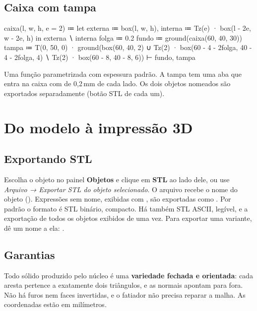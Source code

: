 \subsection{Caixa com tampa}
\begin{csg}[run]
caixa(l, w, h, e = 2) ≔
  let externa ≔ box(l, w, h),
      interna ≔ Tz(e) · box(l - 2e, w - 2e, h)
  in externa ∖ interna
folga ≔ 0.2
fundo ≔ ground(caixa(60, 40, 30))
tampa ≔ T(0, 50, 0) · ground(box(60, 40, 2)
        ∪ Tz(2) · box(60 - 4 - 2folga, 40 - 4 - 2folga, 4)
        ∖ Tz(2) · box(60 - 8, 40 - 8, 6))
⊢ fundo, tampa
\end{csg}
Uma função parametrizada com espessura padrão. A tampa tem uma aba que entra na caixa com  de
0,2\,mm de cada lado. Os dois objetos nomeados são exportados separadamente (botão STL de cada um).

\section{Do modelo à impressão 3D}\label{sec:impressao}

\subsection{Exportando STL}
Escolha o objeto no painel \textbf{Objetos} e clique em \textbf{STL} ao lado dele, ou use \emph{Arquivo → Exportar STL do objeto selecionado}.
O arquivo recebe o nome do objeto (). Expressões sem nome, exibidas com , são exportadas como
. Por padrão o formato é STL binário, compacto. Há também STL ASCII, legível, e a exportação de todos os
objetos exibidos de uma vez. Para exportar uma variante, dê um nome a ela: .

\subsection{Garantias}
Todo sólido produzido pelo núcleo é uma \textbf{variedade fechada e orientada}: cada aresta pertence a exatamente dois triângulos,
e as normais apontam para fora. Não há furos nem faces invertidas, e o fatiador não precisa reparar a malha. As coordenadas estão em milímetros.

